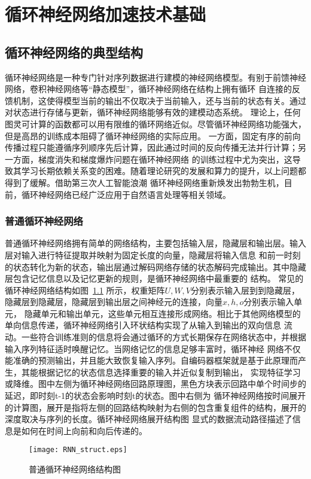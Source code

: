 \chapter{循环神经网络加速技术基础}

\section{循环神经网络的典型结构}
循环神经网络是一种专门针对序列数据进行建模的神经网络模型。有别于前馈神经网络，卷积神经网络等“静态模型”，循环神经网络在结构上拥有循环
自连接的反馈机制，这使得模型当前的输出不仅取决于当前输入，还与当前的状态有关。通过对状态进行存储与更新，循环神经网络能够有效的建模动态系统。
理论上，任何图灵可计算的函数都可以用有限维的循环网络近似。尽管循环神经网络功能强大，但是高昂的训练成本阻碍了循环神经网络的实际应用。
一方面，固定有序的前向传播过程只能遵循序列顺序先后计算，因此通过时间的反向传播无法并行计算；另一方面，梯度消失和梯度爆炸问题在循环神经网络
的训练过程中尤为突出，这导致其学习长期依赖关系变的困难。随着理论研究的发展和算力的提升，以上问题都得到了缓解。借助第三次人工智能浪潮
循环神经网络重新焕发出勃勃生机，目前，循环神经网络已经广泛应用于自然语言处理等相关领域。

\subsection{普通循环神经网络}
普通循环神经网络拥有简单的网络结构，主要包括输入层，隐藏层和输出层。输入层对输入进行特征提取并映射为固定长度的向量，隐藏层将输入信息
和前一时刻的状态转化为新的状态，输出层通过解码网络存储的状态解码完成输出。其中隐藏层包含记忆信息以及记忆更新的规则，是循环神经网络中最重要的
结构。
常见的循环神经网络结构如图~\ref{fig:rnn} 所示，权重矩阵\(U, W, V\)分别表示输入层到到隐藏层，隐藏层到隐藏层，隐藏层到输出层之间神经元的连接，向量\(x, h, o\)分别表示输入单元，
隐藏单元和输出单元，这些单元相互连接形成网络。相比于其他网络模型的单向信息传递，循环神经网络引入环状结构实现了从输入到输出的双向信息
流动。一些符合训练准则的信息将会通过循环的方式长期保存在网络状态中，并根据输入序列特征适时唤醒记忆。当网络记忆的信息足够丰富时，循环神经
网络不仅能准确的预测输出，并且能大致恢复输入序列。自编码器框架就是基于此原理而产生，其能根据记忆的状态信息选择重要的输入并近似复制到输出，
实现特征学习或降维。图中左侧为循环神经网络回路原理图，黑色方块表示回路中单个时间步的延迟，即时刻t-1的状态会影响时刻t的状态。图中右侧为
循环神经网络按时间展开的计算图，展开是指将左侧的回路结构映射为右侧的包含重复组件的结构，展开的深度取决与序列的长度。循环神经网络展开结构图
显式的数据流动路径描述了信息是如何在时间上向前和向后传递的。
\begin{figure}
	\centering
	\texttt{[image: RNN\_struct.eps]}
	\caption{普通循环神经网络结构图}
	\label{fig:rnn}
\end{figure}

